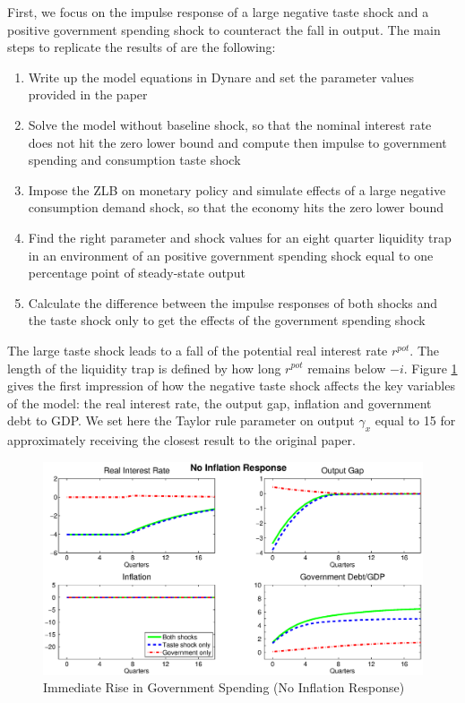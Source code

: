 \documentclass[12pt,a4paper,oneside,titlepage]{article}
\begin{document}
First, we focus on the impulse response of a large negative taste shock and a positive government spending shock to counteract the fall in output. The main steps to replicate the results of \citet{Erceg.2014} are the following:
\begin{enumerate}
\item Write up the model equations in Dynare and set the parameter values provided in the paper\vspace{-0.3cm}
\item Solve the model without baseline shock, so that the nominal interest rate does not hit the zero lower bound and compute then impulse to government spending and consumption taste shock\vspace{-0.3cm}
\item Impose the ZLB on monetary policy and simulate effects of a large negative consumption demand shock, so that the economy hits the zero lower bound\vspace{-0.3cm}
\item Find the right parameter and shock values for an eight quarter liquidity trap in an environment of an positive government spending shock equal to one percentage point of steady-state output\vspace{-0.3cm}
\item Calculate the difference between the impulse responses of both shocks and the taste shock only to get the effects of the government spending shock
\end{enumerate}
The large taste shock leads to a fall of the potential real interest rate $r^{pot}$. The length of the liquidity trap is defined by how long $r^{pot}$ remains below $-i$.
Figure \ref{IRnoinflation} gives the first impression of how the negative taste shock affects the key variables of the model: the real interest rate, the output gap, inflation and government debt to GDP. We set here the Taylor rule parameter on output $\gamma_x$ equal to 15 for approximately receiving the closest result to the original paper.   
\begin{figure}[th]
\includegraphics[width=\textwidth]{Paperpics/Figure2noIR}
\caption{Immediate Rise in Government Spending (No Inflation Response)}
\label{IRnoinflation}
\end{figure}
\end{document}
